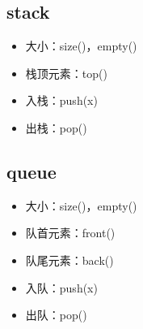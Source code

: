 \documentclass[letterpaper,10pt,english]{sphinxmanual}
\begin{document}
\subsection{stack}
\label{\detokenize{cpp/19_stl:stack}}
%
\begin{sphinxVerbatim}[commandchars=\\\{\}]
\end{sphinxVerbatim}
\begin{itemize}
\item {} 
大小：size()，empty()

\item {} 
栈顶元素：top()

\item {} 
入栈：push(x)

\item {} 
出栈：pop()

%
\begin{sphinxVerbatim}[commandchars=\\\{\}]
 
\end{sphinxVerbatim}

\end{itemize}


\subsection{queue}
\label{\detokenize{cpp/19_stl:queue}}
%
\begin{sphinxVerbatim}[commandchars=\\\{\}]
\end{sphinxVerbatim}
\begin{itemize}
\item {} 
大小：size()，empty()

\item {} 
队首元素：front()

\item {} 
队尾元素：back()

\item {} 
入队：push(x)

\item {} 
出队：pop()

%
\begin{sphinxVerbatim}[commandchars=\\\{\}]
 
\end{sphinxVerbatim}

\end{itemize}
\end{document}
